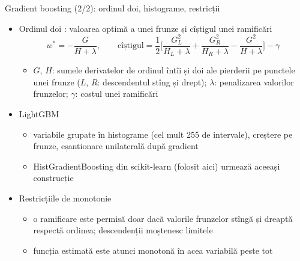 \begin{frame}{Gradient boosting (2/2): ordinul doi, histograme, restricții}
\itemsize{\small}
\begin{itemize}
    \item Ordinul doi : valoarea optimă a unei frunze și cîștigul unei ramificări
    \[ w^* = -\frac{G}{H + \lambda}, \qquad \text{cîștigul} = \frac12\Big[\frac{G_L^2}{H_L + \lambda} + \frac{G_R^2}{H_R + \lambda} - \frac{G^2}{H + \lambda}\Big] - \gamma \]
    \begin{itemize}
        \item $G$, $H$: sumele derivatelor de ordinul întîi și doi ale pierderii pe punctele unei frunze ($L$, $R$: descendentul stîng și drept); $\lambda$: penalizarea valorilor frunzelor; $\gamma$: costul unei ramificări
    \end{itemize}
    \item LightGBM 
    \begin{itemize}
        \item variabile grupate în histograme (cel mult 255 de intervale), creștere pe frunze, eșantionare unilaterală după gradient
        \item HistGradientBoosting din scikit-learn (folosit aici) urmează aceeași construcție
    \end{itemize}
    \item Restricțiile de monotonie
    \begin{itemize}
        \item o ramificare este permisă doar dacă valorile frunzelor stîngă și dreaptă respectă ordinea; descendenții moștenesc limitele
        \item funcția estimată este atunci monotonă în acea variabilă peste tot
    \end{itemize}
\end{itemize}
\end{frame}

